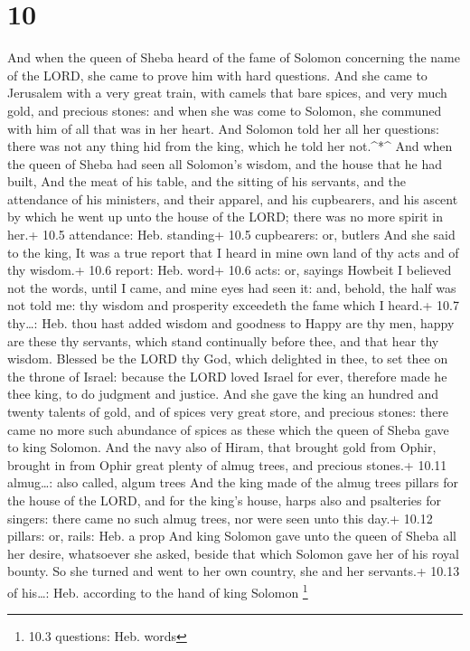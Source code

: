 \hypertarget{section-9}{%
\section{10}\label{section-9}}

 And when the queen of Sheba heard of the fame of Solomon
concerning the name of the LORD, she came to prove him with hard
questions.  And she came to Jerusalem with a very great
train, with camels that bare spices, and very much gold, and precious
stones: and when she was come to Solomon, she communed with him of all
that was in her heart.  And Solomon told her all her
questions: there was not any thing hid from the king, which he told her
not.\^{}*\^{}  And when the queen of Sheba had seen all
Solomon's wisdom, and the house that he had built,  And the
meat of his table, and the sitting of his servants, and the attendance
of his ministers, and their apparel, and his cupbearers, and his ascent
by which he went up unto the house of the LORD; there was no more spirit
in her.+ 10.5 attendance: Heb. standing+ 10.5 cupbearers: or, butlers
 And she said to the king, It was a true report that I heard
in mine own land of thy acts and of thy wisdom.+ 10.6 report: Heb. word+
10.6 acts: or, sayings  Howbeit I believed not the words,
until I came, and mine eyes had seen it: and, behold, the half was not
told me: thy wisdom and prosperity exceedeth the fame which I heard.+
10.7 thy\ldots: Heb. thou hast added wisdom and goodness to 
Happy are thy men, happy are these thy servants, which stand continually
before thee, and that hear thy wisdom.  Blessed be the LORD
thy God, which delighted in thee, to set thee on the throne of Israel:
because the LORD loved Israel for ever, therefore made he thee king, to
do judgment and justice.  And she gave the king an hundred
and twenty talents of gold, and of spices very great store, and precious
stones: there came no more such abundance of spices as these which the
queen of Sheba gave to king Solomon.  And the navy also of
Hiram, that brought gold from Ophir, brought in from Ophir great plenty
of almug trees, and precious stones.+ 10.11 almug\ldots: also called,
algum trees  And the king made of the almug trees pillars
for the house of the LORD, and for the king's house, harps also and
psalteries for singers: there came no such almug trees, nor were seen
unto this day.+ 10.12 pillars: or, rails: Heb. a prop  And
king Solomon gave unto the queen of Sheba all her desire, whatsoever she
asked, beside that which Solomon gave her of his royal bounty. So she
turned and went to her own country, she and her servants.+ 10.13 of
his\ldots: Heb. according to the hand of king Solomon \footnote{10.3
  questions: Heb. words}

